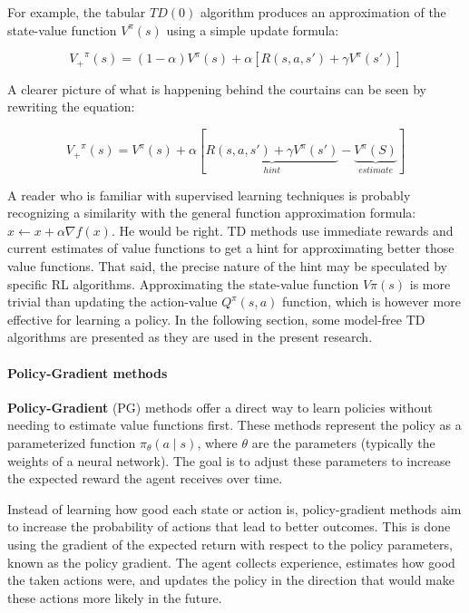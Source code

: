 For example, the tabular $TD(0)$ algorithm produces an approximation of the state-value function $V^\pi(s)$ using a simple update formula:

\begin{equation} \label{eq:TD0-update}
  {V_+}^\pi(s) = (1 - \alpha) V^\pi(s) + \alpha \left[ R(s, a, s') + \gamma V^\pi(s') \right]
\end{equation}

A clearer picture of what is happening behind the courtains can be seen by rewriting the equation:

\begin{equation} \label{eq:TD0-update-rewritten}
  {V_+}^\pi(s) = V^\pi(s) + \alpha \left[ \underbrace{R(s, a, s') + \gamma V^\pi(s')}_{hint} - \underbrace{V^\pi(S)}_{estimate} \right]
\end{equation}

A reader who is familiar with supervised learning techniques is probably recognizing a similarity with the general function approximation formula: $x \leftarrow x + \alpha \nabla f(x)$.
He would be right. TD methods use immediate rewards and current estimates of value functions to get a hint for approximating better those value functions.
That said, the precise nature of the hint may be speculated by specific RL algorithms. Approximating the state-value function $V\pi(s)$ is more trivial than updating the action-value $Q^\pi(s, a)$ function, which is however more effective for learning a policy. In the following section, some model-free TD algorithms are presented as they are used in the present research.

\paragraph{Policy-Gradient methods}

\textbf{Policy-Gradient} (PG) \cite{sutton1999policy} methods offer a direct way to learn policies without needing to estimate value functions first. These methods represent the policy as a parameterized function $\pi_\theta(a \mid s)$, where $\theta$ are the parameters (typically the weights of a neural network). The goal is to adjust these parameters to increase the expected reward the agent receives over time.

Instead of learning how good each state or action is, policy-gradient methods aim to increase the probability of actions that lead to better outcomes. This is done using the gradient of the expected return with respect to the policy parameters, known as the policy gradient. The agent collects experience, estimates how good the taken actions were, and updates the policy in the direction that would make these actions more likely in the future.


